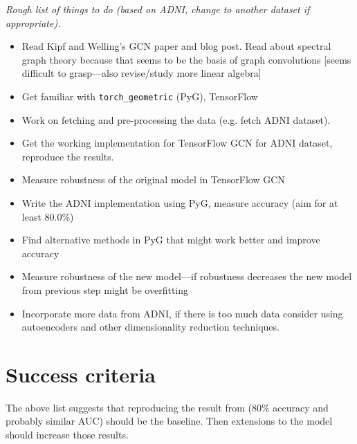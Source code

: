 \documentclass[12pt,a4paper,twoside]{article}
\begin{document}
\textit{Rough list of things to do (based on ADNI, change to another dataset if appropriate).}
\begin{itemize}
  \item Read Kipf and Welling's GCN paper \cite{kipf2017semi} and blog post. Read about spectral graph theory because that seems to be the basis of graph convolutions [seems difficult to grasp—also revise/study more linear algebra]
  \item Get familiar with \texttt{torch\_geometric} (PyG), TensorFlow
  \item Work on fetching and pre-processing the data (e.g. fetch ADNI dataset).
  \item Get the working implementation for TensorFlow GCN for ADNI dataset, reproduce the results.
  \item Measure robustness of the original model in TensorFlow GCN
  \item Write the ADNI implementation using PyG, measure accuracy (aim for at least 80.0\%)
  \item Find alternative methods in PyG that might work better and improve accuracy
  \item Measure robustness of the new model—if robustness decreases the new model from previous step might be overfitting
  \item Incorporate more data from ADNI, if there is too much data consider using autoencoders and other dimensionality reduction techniques.
\end{itemize}

\section*{Success criteria}




The above list suggests that reproducing the result from \cite{parisot2018disease} (80\% accuracy and probably similar AUC) should be the baseline. Then extensions to the model should increase those results.
\end{document}
